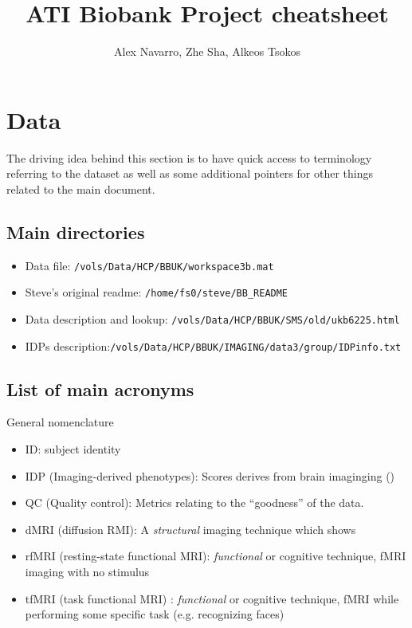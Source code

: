 \documentclass{article}
\begin{document}
\title{ATI Biobank Project cheatsheet}

\author{Alex Navarro, Zhe Sha, Alkeos Tsokos}

\maketitle

\section{Data\label{sec:data}}
The driving idea behind this section is to have quick access to terminology referring to the dataset as well as some additional pointers for other things related to the main document.

\subsection{Main directories\label{sec:data-dir}}

\begin{itemize}
\item Data file: {\tt /vols/Data/HCP/BBUK/workspace3b.mat}
\item Steve's original readme: {\tt /home/fs0/steve/BB\_README}
\item Data description and lookup: {\tt /vols/Data/HCP/BBUK/SMS/old/ukb6225.html}
\item IDPs description:{\tt  /vols/Data/HCP/BBUK/IMAGING/data3/group/IDPinfo.txt}
\end{itemize}

\subsection{List of main acronyms\label{sec:data-acro}}

General nomenclature
\begin{itemize}
\item ID: subject identity
\item IDP (Imaging-derived phenotypes): Scores derives from brain imaginging ()
\item QC (Quality control): Metrics relating to the ``goodness'' of the data.
\item dMRI (diffusion RMI): A \emph{structural} imaging technique which shows
\item rfMRI (resting-state functional MRI): \emph{functional} or cognitive technique, fMRI imaging with no stimulus
\item tfMRI (task functional MRI) : \emph{functional} or cognitive technique, fMRI while performing some specific task (e.g. recognizing faces)
\end{itemize}
\end{document}

